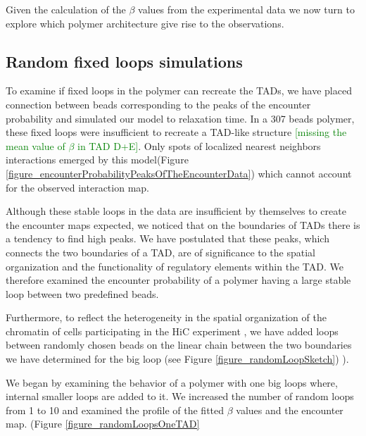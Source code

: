 \documentclass[12pt]{paper}
\begin{document}
Given the calculation of the $\beta$ values from the experimental data we now turn to explore which polymer architecture give rise to the observations.

\subsection{Random fixed loops simulations}
To examine if fixed loops in the polymer can recreate the TADs, we have placed connection between beads corresponding to the peaks of the encounter probability and simulated our model to relaxation time.
In a 307 beads polymer, these fixed loops were insufficient to recreate a TAD-like structure
\textcolor{green}{[missing the mean value of $\beta$ in TAD D+E]}. Only spots of localized nearest neighbors interactions emerged by this model(Figure \ref{figure_encounterProbabilityPeaksOfTheEncounterData}) which cannot account for the observed interaction map. 

Although these stable loops in the data are insufficient by themselves to create the encounter maps expected, we noticed that on the boundaries of TADs there is a tendency to find high peaks. We have postulated that these peaks, which connects the two boundaries of a TAD, are of significance to the spatial organization and the functionality of regulatory elements within the TAD. We therefore examined the encounter probability of a polymer having a large stable loop between two predefined beads.  

Furthermore, to reflect the heterogeneity in the spatial organization of the chromatin of cells participating in the HiC experiment \cite{dekker2013exploring} \cite{Nora2012}, we have added loops between randomly chosen beads on the linear chain between the two boundaries we have determined for the big loop (see Figure \ref{figure_randomLoopSketch}) ). 

We began by examining the behavior of a polymer with one big loops where, internal smaller loops are added to it. 
We increased the number of random loops from 1 to 10 and examined the profile of the fitted $\beta$ values and the encounter map. (Figure \ref{figure_randomLoopsOneTAD}
\end{document}
